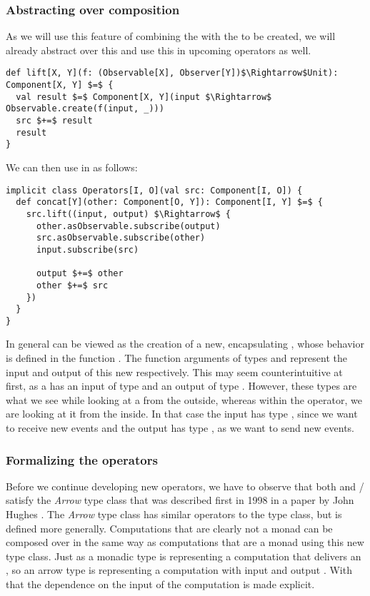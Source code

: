 \subsubsection{Abstracting over composition}
As we will use this feature of combining the \subs with the \comp to be created, we will already abstract over this and use this in upcoming operators as well.

\begin{lstlisting}[style=ScalaStyle, caption={\code{lift} operator}, label={lst:lift-operator}]
def lift[X, Y](f: (Observable[X], Observer[Y])$\Rightarrow$Unit): Component[X, Y] $=$ {
  val result $=$ Component[X, Y](input $\Rightarrow$ Observable.create(f(input, _)))
  src $+=$ result
  result
}
\end{lstlisting}

We can then use  in  as follows:

\begin{lstlisting}[style=ScalaStyle, caption={Revised implementation of the \code{concat} operator}, label={lst:concat-revised}]
implicit class Operators[I, O](val src: Component[I, O]) {
  def concat[Y](other: Component[O, Y]): Component[I, Y] $=$ {
    src.lift((input, output) $\Rightarrow$ {
      other.asObservable.subscribe(output)
      src.asObservable.subscribe(other)
      input.subscribe(src)

      output $+=$ other
      other $+=$ src
    })
  }
}
\end{lstlisting}

In general  can be viewed as the creation of a new, encapsulating \comp, whose behavior is defined in the function . The function arguments of types \obs and \obv represent the input and output of this new \comp respectively. This may seem counterintuitive at first, as a \comp has an input of type \obv and an output of type \obs. However, these types are what we see while looking at a \comp from the outside, whereas within the  operator, we are looking at it from the inside. In that case the input has type \obs, since we want to receive new events and the output has type \obv, as we want to send new events.

\subsubsection{Formalizing the operators}
Before we continue developing new operators, we have to observe that both  and / satisfy the \textit{Arrow} type class that was described first in 1998 in a paper by John Hughes . The \textit{Arrow}  type class has similar operators to the  type class, but is defined more generally. Computations that are clearly not a monad can be composed over in the same way as computations that are a monad using this new type class. Just as a monadic type  is representing a computation that delivers an , so an arrow type  is representing a computation with input  and output . With that the dependence on the input of the computation is made explicit.

